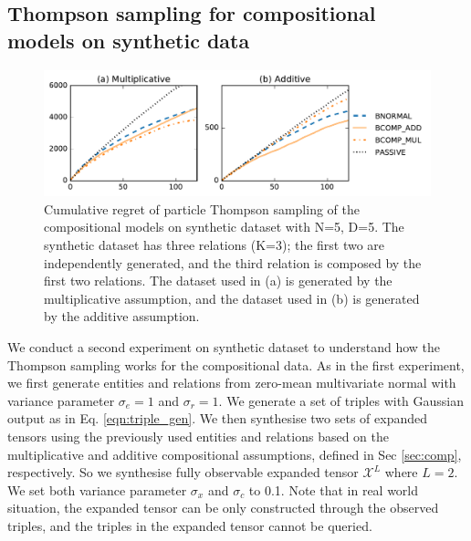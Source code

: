 \subsection{Thompson sampling for compositional\\ models on synthetic data}
\begin{figure}[t]
	\centering
	\includegraphics[width=\linewidth]{images/toy_comp_5_2_5.pdf}
	\caption{\label{fig:comp_synthetic} Cumulative regret of particle Thompson sampling of the compositional models on synthetic dataset with N=5, D=5. The synthetic dataset has three relations (K=3); the first two are independently generated, and the third relation is composed by the first two relations. The dataset used in (a) is generated by the multiplicative assumption, and the dataset used in (b) is generated by the additive assumption.}
\end{figure}

We conduct a second experiment on synthetic dataset to understand how
the Thompson sampling works for the compositional data. 
As in the first experiment, we first generate entities and relations from 
zero-mean multivariate normal with variance parameter $\sigma_e = 1$ and 
$\sigma_r=1$. We generate a set of triples with Gaussian output as in 
Eq. \ref{eqn:triple_gen}. We then synthesise two sets of expanded tensors 
using the previously used entities and relations based on the multiplicative 
and additive compositional assumptions, defined in Sec \ref{sec:comp}, 
respectively. So we synthesise fully observable expanded tensor $\mathcal{X}^L$ 
where $L=2$. We set both variance parameter $\sigma_x$ and $\sigma_c$ to 0.1. Note that in real world situation, the expanded tensor can be only constructed through the observed triples, and the triples in the expanded tensor cannot be queried.


